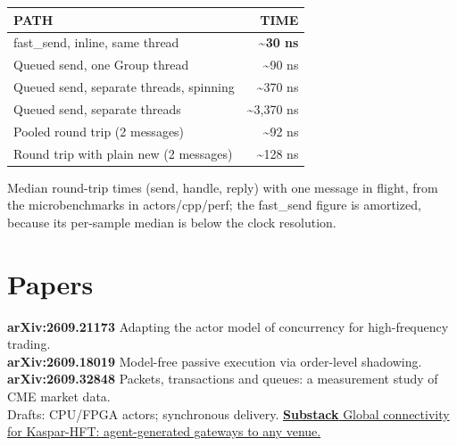 \documentclass[10pt]{article}
\newcommand{\code}[1]{{\ttfamily\small #1}}
\newcommand{\tnote}[1]{{\color{ink2}\footnotesize #1\par}}
\begin{document}
\vspace{3pt}
\noindent\begin{tabularx}{\textwidth}{@{}Xr@{}}
\toprule
{\color{ink3}\sffamily\bfseries\scriptsize PATH} &
{\color{ink3}\sffamily\bfseries\scriptsize TIME} \\
\midrule
\code{fast\_send}, inline, same thread & {\color{accent}\bfseries\code{\textasciitilde30 ns}} \\
Queued send, one \code{Group} thread & \code{\textasciitilde90 ns} \\
Queued send, separate threads, spinning & \code{\textasciitilde370 ns} \\
Queued send, separate threads & \code{\textasciitilde3{,}370 ns} \\
\midrule
Pooled round trip (2 messages) & \code{\textasciitilde92 ns} \\
Round trip with plain \code{new} (2 messages) & \code{\textasciitilde128 ns} \\
\bottomrule
\end{tabularx}

\vspace{3pt}
\tnote{Median round-trip times (send, handle, reply) with one message in flight, from
the microbenchmarks in \code{actors/cpp/perf}; the \code{fast\_send} figure is amortized, because its
per-sample median is below the clock resolution.}

\section{Papers}
\vspace{2pt}
{\footnotesize
\noindent\textbf{arXiv:2609.21173} Adapting the actor model of concurrency for high-frequency trading.\\
\textbf{arXiv:2609.18019} Model-free passive execution via order-level shadowing.\\
\textbf{arXiv:2609.32848} Packets, transactions and queues: a measurement study of CME market data.\\
Drafts: CPU/FPGA actors; synchronous delivery.
\href{https://vincentmayeski.substack.com/p/global-connectivity-for-kaspar-hft}{\textbf{Substack} Global connectivity for Kaspar-HFT: agent-generated gateways to any venue.}}


\end{document}
